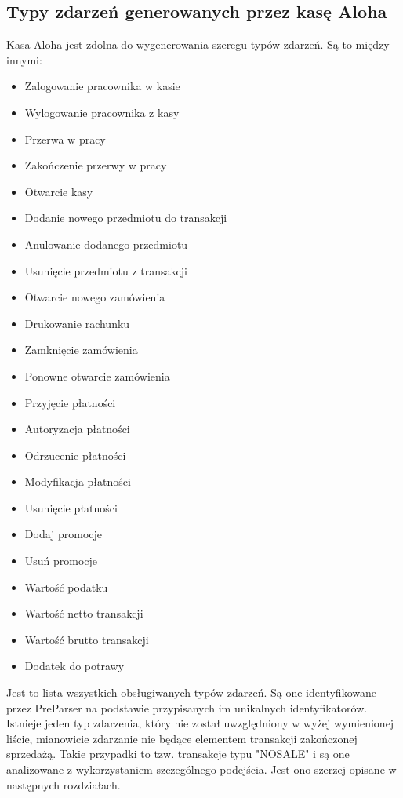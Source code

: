 \documentclass[a4paper]{book}
\begin{document}
\subsection{Typy zdarzeń generowanych przez kasę Aloha}
Kasa Aloha jest zdolna do wygenerowania szeregu typów zdarzeń. Są to między innymi:
\begin{itemize}
	\item Zalogowanie pracownika w kasie
	\item Wylogowanie pracownika z kasy
	\item Przerwa w pracy
	\item Zakończenie przerwy w pracy
	\item Otwarcie kasy
	\item Dodanie nowego przedmiotu do transakcji
	\item Anulowanie dodanego przedmiotu
	\item Usunięcie przedmiotu z transakcji
	\item Otwarcie nowego zamówienia
	\item Drukowanie rachunku
	\item Zamknięcie zamówienia
	\item Ponowne otwarcie zamówienia
	\item Przyjęcie płatności
	\item Autoryzacja płatności
	\item Odrzucenie płatności
	\item Modyfikacja płatności
	\item Usunięcie płatności
	\item Dodaj promocje
	\item Usuń promocje
	\item Wartość podatku
	\item Wartość netto transakcji
	\item Wartość brutto transakcji
	\item Dodatek do potrawy
\end{itemize}
Jest to lista wszystkich obsługiwanych typów zdarzeń. Są one identyfikowane przez PreParser na podstawie przypisanych im unikalnych identyfikatorów. Istnieje  jeden typ zdarzenia, który nie został uwzględniony w wyżej wymienionej liście, mianowicie zdarzanie nie będące elementem transakcji zakończonej sprzedażą. Takie przypadki to tzw. transakcje typu "NOSALE" i są  one analizowane z wykorzystaniem szczególnego podejścia. Jest ono szerzej opisane w następnych rozdziałach.
\end{document}
